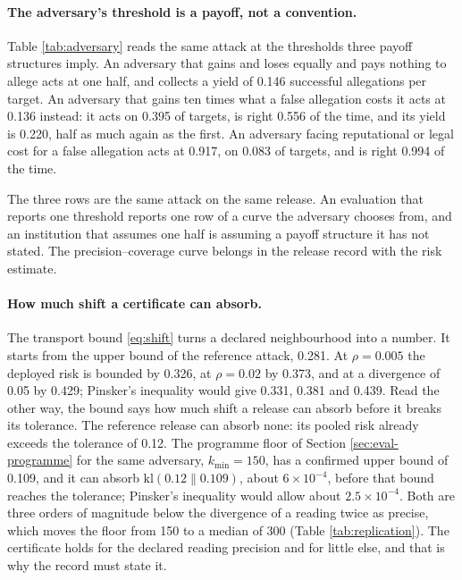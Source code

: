 \documentclass[11pt,a4paper]{article}
\theoremstyle{plain}
\theoremstyle{definition}
\theoremstyle{definition}
\theoremstyle{plain}
\begin{document}
\paragraph{The adversary's threshold is a payoff, not a convention.}
Table \ref{tab:adversary} reads the same attack at the thresholds three payoff
structures imply. An adversary that gains and loses equally and pays nothing to
allege acts at one half, and collects a yield of 0.146 successful
allegations per target. An adversary that gains ten times what a false allegation
costs it acts at 0.136 instead: it acts on 0.395 of
targets, is right 0.556 of the time, and its yield is
0.220, half as much again as the first. An adversary facing reputational or
legal cost for a false allegation acts at 0.917, on
0.083 of targets, and is right 0.994 of the
time.



The three rows are the same attack on the same release. An evaluation that reports
one threshold reports one row of a curve the adversary chooses from, and an
institution that assumes one half is assuming a payoff structure it has not stated.
The precision--coverage curve belongs in the release record with the risk estimate.

\paragraph{How much shift a certificate can absorb.}
The transport bound \eqref{eq:shift} turns a declared neighbourhood into a number.
It starts from the upper bound of the reference attack, 0.281. At $\rho = 0.005$
the deployed risk is bounded by 0.326, at $\rho = 0.02$ by 0.373, and at a
divergence of 0.05 by 0.429; Pinsker's inequality would give 0.331, 0.381 and
0.439. Read the other way, the bound says how much shift a release can absorb
before it breaks its tolerance. The reference release can absorb none: its
pooled risk already exceeds the tolerance of 0.12. The programme floor of
Section \ref{sec:eval-programme} for the same adversary, $k_{\min} = 150$, has a
confirmed upper bound of 0.109, and it can absorb $\mathrm{kl}(0.12\|0.109)$,
about $6\times10^{-4}$, before that bound reaches the tolerance; Pinsker's
inequality would allow about $2.5\times10^{-4}$. Both are three orders of
magnitude below the divergence of a reading twice as precise, which moves the
floor from 150 to a median of 300 (Table \ref{tab:replication}). The certificate
holds for the declared reading precision and for little else, and that is why
the record must state it.
\end{document}
